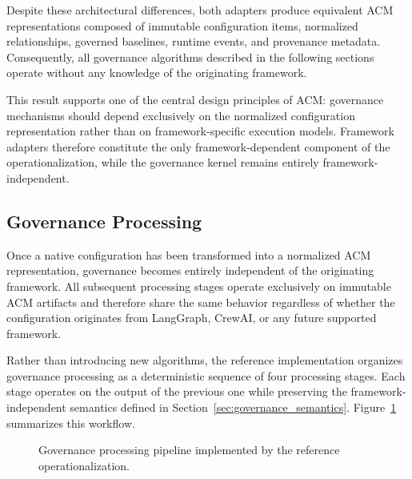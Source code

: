 \documentclass[10pt]{article}
\begin{document}
Despite these architectural differences, both adapters produce equivalent ACM representations composed of immutable configuration items, normalized relationships, governed baselines, runtime events, and provenance metadata. Consequently, all governance algorithms described in the following sections operate without any knowledge of the originating framework.

This result supports one of the central design principles of ACM: governance mechanisms should depend exclusively on the normalized configuration representation rather than on framework-specific execution models. Framework adapters therefore constitute the only framework-dependent component of the operationalization, while the governance kernel remains entirely framework-independent.

\subsection{Governance Processing}
\label{sec:governance_algorithms}

Once a native configuration has been transformed into a normalized ACM representation, governance becomes entirely independent of the originating framework. All subsequent processing stages operate exclusively on immutable ACM artifacts and therefore share the same behavior regardless of whether the configuration originates from LangGraph, CrewAI, or any future supported framework.

Rather than introducing new algorithms, the reference implementation organizes governance processing as a deterministic sequence of four processing stages. Each stage operates on the output of the previous one while preserving the framework-independent semantics defined in Section~\ref{sec:governance_semantics}. Figure~\ref{fig:governance_processing_pipeline} summarizes this workflow.

\begin{figure}[ht]
\centering
{}

\caption{Governance processing pipeline implemented by the reference operationalization.}
\label{fig:governance_processing_pipeline}
\end{figure}
\end{document}
